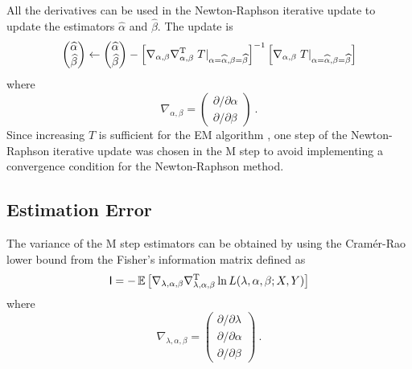 All the derivatives can be used in the Newton-Raphson iterative update to update the estimators $\widehat{\alpha}$ and $\widehat{\beta}$. The update is
\begin{equation}
  \begin{pmatrix}
    \widehat{\alpha} \\ \widehat{\beta}
  \end{pmatrix}
  \leftarrow
  \begin{pmatrix}
    \widehat{\alpha} \\ \widehat{\beta}
  \end{pmatrix}
  -
  \left[
    \nabla_{\alpha,\beta}\nabla_{\alpha,\beta}^\textup{T} \left. T \right |_{\alpha = \widehat{\alpha}, \beta=\widehat{\beta}}
  \right]^{-1}
  \left[
    \nabla_{\alpha,\beta} \left. T \right |_{\alpha = \widehat{\alpha}, \beta=\widehat{\beta}}
  \right]
\end{equation}
where
\begin{equation}
  \nabla_{\alpha,\beta}=
  \begin{pmatrix}
    {\partial}/{\partial \alpha}
    \\
    {\partial}/{\partial \beta}
  \end{pmatrix}
  \ .
\end{equation}
Since increasing $T$ is sufficient for the EM algorithm \citep{dempster1977maximum}, one step of the Newton-Raphson iterative update was chosen in the M step to avoid implementing a convergence condition for the Newton-Raphson method.

\subsection{Estimation Error}

The variance of the M step estimators can be obtained by using the Cram\'er-Rao lower bound \citep{rao1945information, cramer1946mathematical} from the Fisher's information matrix \citep{fisher1922on} defined as
\begin{equation}
  \mathsf{I} = -\operatorname{\mathbb{E}}\left[
    \nabla_{\lambda,\alpha,\beta}\nabla_{\lambda,\alpha,\beta}^\textup{T} \ln L(\lambda,\alpha,\beta;X,Y)
  \right]
\end{equation}
where
\begin{equation}
  \nabla_{\lambda, \alpha,\beta}=
  \begin{pmatrix}
    {\partial}/{\partial \lambda}
    \\
    {\partial}/{\partial \alpha}
    \\
    {\partial}/{\partial \beta}
  \end{pmatrix}
  \ .
\end{equation}


